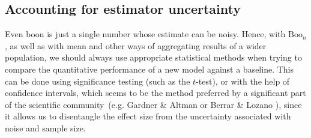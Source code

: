 \documentclass{article}
\newcommand{\ml}{\gls{ml}\xspace}
\newcommand{\boo}[1]{\text{Boo}_{#1}}
\newcommand{\tboon}{\gls{boon}\xspace}
\newcommand{\Em}[1]{\boo{#1}}
\newcommand{\emn}{\Em{n}}
\begin{document}

\subsection{Accounting for estimator uncertainty}




Even \tboon is just a single number whose estimate can be noisy. Hence, with $\emn$, as well as with mean and other ways of aggregating results of a wider population, we should always use appropriate statistical methods when trying to compare the quantitative performance of a new model against a baseline. This can be done using significance testing (such as the $t$-test), or with the help of confidence intervals, which seems to be the method preferred by a significant part of the scientific community~(e.g. Gardner \& Altman  or Berrar \& Lozano ), since it allows us to disentangle the effect size from the uncertainty associated with noise and sample size. 
\end{document}
